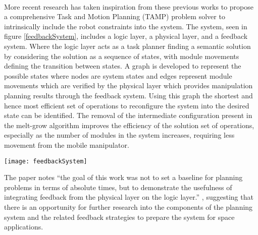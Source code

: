\\
More recent research has taken inspiration from these previous works to propose a comprehensive Task and Motion Planning (TAMP) problem solver \cite{9438257} to intrinsically include the robot constraints into the system.  The system, seen in figure \ref{feedbackSystem}, includes a logic layer, a physical layer, and a feedback system. Where the logic layer acts as a task planner finding a semantic solution by considering the solution as a sequence of states, with module movements defining the transition between states. A graph is developed to represent the possible states where nodes are system states and edges represent module movements which are verified by the physical layer which provides manipulation planning results through the feedback system. Using this graph the shortest and hence most efficient set of operations to reconfigure the system into the desired state can be identified. The removal of the intermediate configuration present in the melt-grow algorithm improves the efficiency of the solution set of operations, especially as the number of modules in the system increases, requiring less movement from the mobile manipulator.
\begin{figure*}[!t]
	\centering
	\texttt{[image: feedbackSystem]}
	\caption{“Architecture of the autonomous robot planning system. The system receives as inputs the start and goal satellite configurations, and iterates between the logic and physical layer until a solution is found.” Image and text from \cite{9438257}}
	\label{feedbackSystem}
\end{figure*}
The paper notes “the goal of this work was not to set a baseline for planning problems in terms of absolute times, but to demonstrate the usefulness of integrating feedback from the physical layer on the logic layer.” \cite{9438257}, suggesting that there is an opportunity for further research into the components of the planning system and the related feedback strategies to prepare the system for space applications.